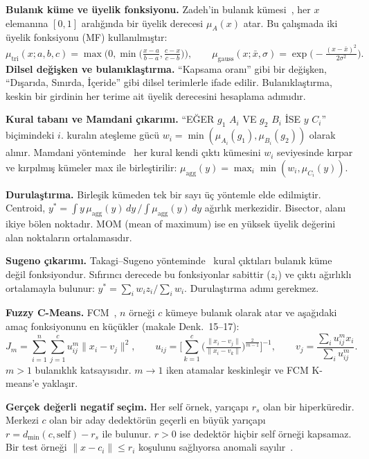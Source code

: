 \documentclass[11pt,a4paper]{article}
\newcommand{\gbir}{g_1}
\newcommand{\giki}{g_2}
\begin{document}
\textbf{Bulanık küme ve üyelik fonksiyonu.} Zadeh'in bulanık kümesi~\cite{zadeh1965}, her $x$ elemanına $[0,1]$ aralığında bir üyelik derecesi $\mu_A(x)$ atar. Bu çalışmada iki üyelik fonksiyonu (MF) kullanılmıştır:
\begin{equation}
\mu_{\text{tri}}(x;a,b,c)=\max\!\Big(0,\min\!\Big(\tfrac{x-a}{b-a},\tfrac{c-x}{c-b}\Big)\Big),\qquad
\mu_{\text{gauss}}(x;\bar{x},\sigma)=\exp\!\Big(-\tfrac{(x-\bar{x})^2}{2\sigma^2}\Big).
\end{equation}
\textbf{Dilsel değişken ve bulanıklaştırma.} ``Kapsama oranı'' gibi bir değişken, ``Dışarıda, Sınırda, İçeride'' gibi dilsel terimlerle ifade edilir. Bulanıklaştırma, keskin bir girdinin her terime ait üyelik derecesini hesaplama adımıdır.

\textbf{Kural tabanı ve Mamdani çıkarımı.} ``EĞER $\gbir$ $A_i$ VE $\giki$ $B_i$ İSE $y$ $C_i$'' biçimindeki $i$. kuralın ateşleme gücü $w_i=\min(\mu_{A_i}(\gbir),\mu_{B_i}(\giki))$ olarak alınır. Mamdani yönteminde~\cite{mamdani1975} her kural kendi çıktı kümesini $w_i$ seviyesinde kırpar ve kırpılmış kümeler max ile birleştirilir: $\mu_{\text{agg}}(y)=\max_i \min(w_i,\mu_{C_i}(y))$.

\textbf{Durulaştırma.} Birleşik kümeden tek bir sayı üç yöntemle elde edilmiştir. Centroid, $y^*=\int y\,\mu_{\text{agg}}(y)\,dy\,/\int\mu_{\text{agg}}(y)\,dy$ ağırlık merkezidir. Bisector, alanı ikiye bölen noktadır. MOM (mean of maximum) ise en yüksek üyelik değerini alan noktaların ortalamasıdır.

\textbf{Sugeno çıkarımı.} Takagi--Sugeno yönteminde~\cite{takagi1985} kural çıktıları bulanık küme değil fonksiyondur. Sıfırıncı derecede bu fonksiyonlar sabittir ($z_i$) ve çıktı ağırlıklı ortalamayla bulunur: $y^*=\sum_i w_i z_i/\sum_i w_i$. Durulaştırma adımı gerekmez.

\textbf{Fuzzy C-Means.} FCM~\cite{bezdek1984}, $n$ örneği $c$ kümeye bulanık olarak atar ve aşağıdaki amaç fonksiyonunu en küçükler (makale Denk.~15--17):
\begin{equation}
J_m=\sum_{i=1}^{n}\sum_{j=1}^{c}u_{ij}^{m}\lVert x_i-v_j\rVert^2,\qquad
u_{ij}=\Big[\sum_{k=1}^{c}\Big(\tfrac{\lVert x_i-v_j\rVert}{\lVert x_i-v_k\rVert}\Big)^{\frac{2}{m-1}}\Big]^{-1},\qquad
v_j=\frac{\sum_i u_{ij}^m x_i}{\sum_i u_{ij}^m}.
\end{equation}
$m>1$ bulanıklık katsayısıdır. $m\to1$ iken atamalar keskinleşir ve FCM K-means'e yaklaşır.

\textbf{Gerçek değerli negatif seçim.} Her self örnek, yarıçapı $r_s$ olan bir hiperküredir. Merkezi $c$ olan bir aday dedektörün geçerli en büyük yarıçapı $r=d_{\min}(c,\text{self})-r_s$ ile bulunur. $r>0$ ise dedektör hiçbir self örneği kapsamaz. Bir test örneği $\lVert x-c_i\rVert\le r_i$ koşulunu sağlıyorsa anomali sayılır~\cite{ji2004}.
\end{document}
